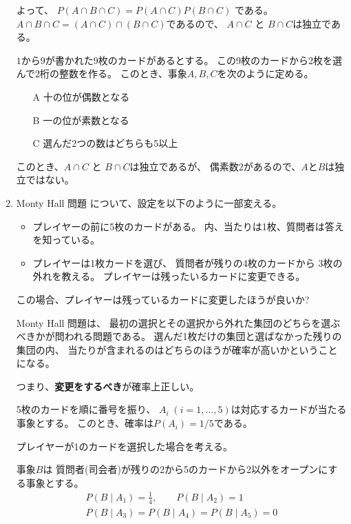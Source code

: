 \documentclass[12pt,b5paper]{ltjsarticle}
\begin{document}
\begin{enumerate}
      よって、
      $P(A\cap B \cap C) = P(A\cap C)P(B \cap C)$
      である。
      $A\cap B \cap C = (A\cap C) \cap (B \cap C)$であるので、
      $A\cap C$ と $B\cap C$は独立である。

      $1$から$9$が書かれた9枚のカードがあるとする。
      この9枚のカードから2枚を選んで2桁の整数を作る。
      このとき、事象$A,B,C$を次のように定める。
      \begin{itemize}
       \item [A] 十の位が偶数となる
       \item [B] 一の位が素数となる
       \item [C] 選んだ2つの数はどちらも5以上
      \end{itemize}

      このとき、$A\cap C$ と $B\cap C$は独立であるが、
      偶素数$2$があるので、$A$と$B$は独立ではない。



      \hrulefill

 \item
      Monty Hall 問題 について、設定を以下のように一部変える。
      \begin{itemize}
       \item プレイヤーの前に5枚のカードがある。
             内、当たりは1枚、質問者は答えを知っている。
       \item プレイヤーは1枚カードを選び、
             質問者が残りの4枚のカードから
             3枚の外れを教える。
             プレイヤーは残ったいるカードに変更できる。
      \end{itemize}
      この場合、プレイヤーは残っているカードに変更したほうが良いか?

      \dotfill

      Monty Hall 問題は、
      最初の選択とその選択から外れた集団のどちらを選ぶべきかが問われる問題である。
      選んだ1枚だけの集団と選ばなかった残りの集団の内、
      当たりが含まれるのはどちらのほうが確率が高いかということになる。

      つまり、\textbf{変更をするべき}が確率上正しい。

      \dotfill


      5枚のカードを順に番号を振り、
      $A_{i}\;(i=1,\dots,5)$は対応するカードが当たる事象とする。
      このとき、確率は$P(A_{i})=1/5$である。

      プレイヤーが1のカードを選択した場合を考える。

      事象$B$は
      質問者(司会者)が残りの2から5のカードから2以外をオープンにする事象とする。
      \begin{gather}
       P(B\mid A_{1})=\frac{1}{4}
        ,\qquad
        P(B\mid A_{2})=1\\
        P(B\mid A_{3})=P(B\mid A_{4})=P(B\mid A_{5})=0
      \end{gather}


\end{enumerate}
\end{document}
